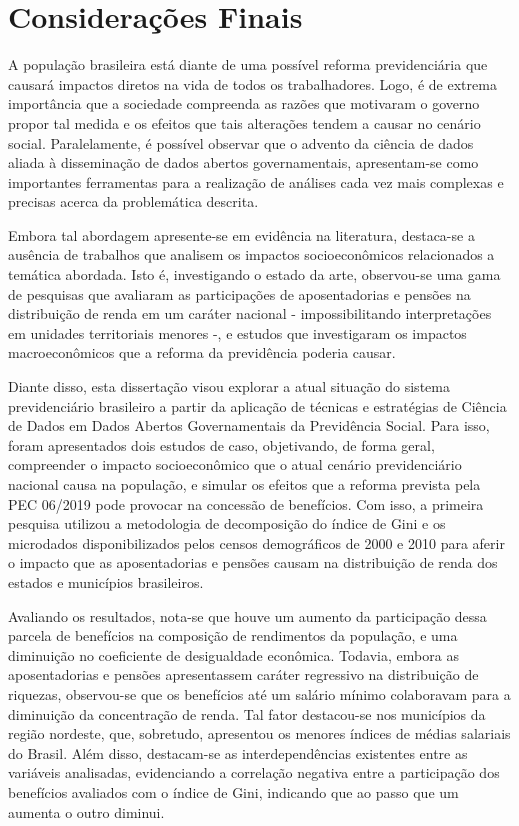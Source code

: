 \chapter{Considerações Finais}\label{cap:conclusao}

A população brasileira está diante de uma possível reforma previdenciária que causará impactos diretos na vida de todos os trabalhadores. Logo, é de extrema importância que a sociedade compreenda as razões que motivaram o governo propor tal medida e os efeitos que tais alterações tendem a causar no cenário social. Paralelamente, é possível observar que o advento da ciência de dados aliada à disseminação de dados abertos governamentais, apresentam-se como importantes ferramentas para a realização de análises cada vez mais complexas e precisas acerca da problemática descrita.

Embora tal abordagem apresente-se em evidência na literatura, destaca-se a ausência de trabalhos que analisem os impactos socioeconômicos relacionados a temática abordada. Isto é, investigando o estado da arte, observou-se uma gama de pesquisas que avaliaram as participações de aposentadorias e pensões na distribuição de renda em um caráter nacional - impossibilitando interpretações em unidades territoriais menores -, e estudos que investigaram os impactos macroeconômicos que a reforma da previdência poderia causar.

Diante disso, esta dissertação visou explorar a atual situação do sistema previdenciário brasileiro a partir da aplicação de técnicas e estratégias de Ciência de Dados em Dados Abertos Governamentais da Previdência Social. Para isso, foram apresentados dois estudos de caso, objetivando, de forma geral, compreender o impacto socioeconômico que o atual cenário previdenciário nacional causa na população, e simular os efeitos que a reforma prevista pela PEC 06/2019 pode provocar na concessão de benefícios. Com isso, a primeira pesquisa utilizou a metodologia de decomposição do índice de Gini e os microdados disponibilizados pelos censos demográficos de 2000 e 2010 para aferir o impacto que as aposentadorias e pensões causam na distribuição de renda dos estados e municípios brasileiros.

Avaliando os resultados, nota-se que houve um aumento da participação dessa parcela de benefícios na composição de rendimentos da população, e uma diminuição no coeficiente de desigualdade econômica. Todavia, embora as aposentadorias e pensões apresentassem caráter regressivo na distribuição de riquezas, observou-se que os benefícios até um salário mínimo colaboravam para a diminuição da concentração de renda. Tal fator destacou-se nos municípios da região nordeste, que, sobretudo, apresentou os menores índices de médias salariais do Brasil. Além disso, destacam-se as interdependências existentes entre as variáveis analisadas, evidenciando a correlação negativa entre a participação dos benefícios avaliados com o índice de Gini, indicando que ao passo que um aumenta o outro diminui.

